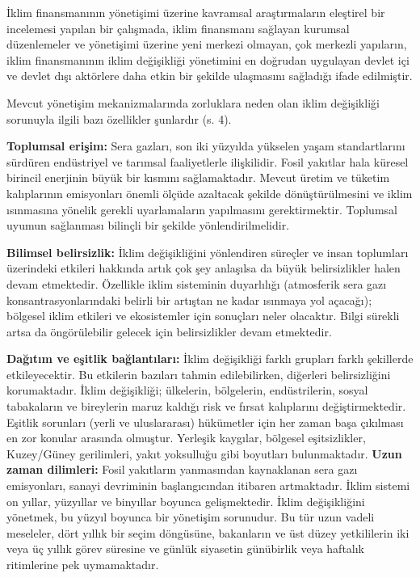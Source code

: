 \documentclass[
]{book}
\begin{document}
İklim finansmanının yönetişimi üzerine kavramsal araştırmaların eleştirel bir incelemesi yapılan bir çalışmada, iklim finansmanı sağlayan kurumsal düzenlemeler ve yönetişimi üzerine yeni merkezi olmayan, çok merkezli yapıların, iklim finansmanının iklim değişikliği yönetimini en doğrudan uygulayan devlet içi ve devlet dışı aktörlere daha etkin bir şekilde ulaşmasını sağladığı ifade edilmiştir. \citep{bracking2021climate}

Mevcut yönetişim mekanizmalarında zorluklara neden olan iklim değişikliği sorunuyla ilgili bazı özellikler şunlardır (s. 4). \citep{meadowcroft2009climate}

\textbf{Toplumsal erişim:} Sera gazları, son iki yüzyılda yükselen yaşam standartlarını sürdüren endüstriyel ve tarımsal faaliyetlerle ilişkilidir. Fosil yakıtlar hala küresel birincil enerjinin büyük bir kısmını sağlamaktadır. Mevcut üretim ve tüketim kalıplarının emisyonları önemli ölçüde azaltacak şekilde dönüştürülmesini ve iklim ısınmasına yönelik gerekli uyarlamaların yapılmasını gerektirmektir. Toplumsal uyumun sağlanması bilinçli bir şekilde yönlendirilmelidir.

\textbf{Bilimsel belirsizlik:} İklim değişikliğini yönlendiren süreçler ve insan toplumları üzerindeki etkileri hakkında artık çok şey anlaşılsa da büyük belirsizlikler halen devam etmektedir. Özellikle iklim sisteminin duyarlılığı (atmosferik sera gazı konsantrasyonlarındaki belirli bir artıştan ne kadar ısınmaya yol açacağı); bölgesel iklim etkileri ve ekosistemler için sonuçları neler olacaktır. Bilgi sürekli artsa da öngörülebilir gelecek için belirsizlikler devam etmektedir.

\textbf{Dağıtım ve eşitlik bağlantıları:} İklim değişikliği farklı grupları farklı şekillerde etkileyecektir. Bu etkilerin bazıları tahmin edilebilirken, diğerleri belirsizliğini korumaktadır. İklim değişikliği; ülkelerin, bölgelerin, endüstrilerin, sosyal tabakaların ve bireylerin maruz kaldığı risk ve fırsat kalıplarını değiştirmektedir. Eşitlik sorunları (yerli ve uluslararası) hükümetler için her zaman başa çıkılması en zor konular arasında olmuştur. Yerleşik kaygılar, bölgesel eşitsizlikler, Kuzey/Güney gerilimleri, yakıt yoksulluğu gibi boyutları bulunmaktadır.
\textbf{Uzun zaman dilimleri:} Fosil yakıtların yanmasından kaynaklanan sera gazı emisyonları, sanayi devriminin başlangıcından itibaren artmaktadır. İklim sistemi on yıllar, yüzyıllar ve binyıllar boyunca gelişmektedir. İklim değişikliğini yönetmek, bu yüzyıl boyunca bir yönetişim sorunudur. Bu tür uzun vadeli meseleler, dört yıllık bir seçim döngüsüne, bakanların ve üst düzey yetkililerin iki veya üç yıllık görev süresine ve günlük siyasetin günübirlik veya haftalık ritimlerine pek uymamaktadır.
\end{document}
